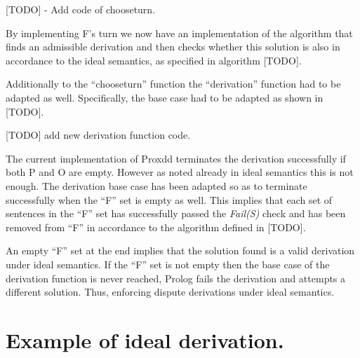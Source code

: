 [TODO] - Add code of choose\textunderscore turn.

By implementing F's turn we now have an implementation of the algorithm that finds an admissible derivation and then checks whether this solution is also in accordance to the ideal semantics, as specified in algorithm [TODO].

Additionally to the ``choose\textunderscore turn'' function the ``derivation'' function had to be adapted as well. Specifically, the base case had to be adapted as shown in [TODO].

[TODO] add new derivation function code.

The current implementation of Proxdd terminates the derivation successfully if both P and O are empty. However as noted already in ideal semantics this is not enough. The derivation base case has been adapted so as to terminate successfully when the ``F'' set is empty as well. This implies that each set of sentences in the ``F'' set has successfully  passed the \emph{Fail(S)} check and has been removed from ``F'' in accordance to the algorithm defined in [TODO]. 

An empty ``F'' set at the end implies that the solution found is a valid derivation under ideal semantics. If the ``F'' set is not empty then the base case of the derivation function is never reached, Prolog fails the derivation and attempts a different solution. Thus, enforcing dispute derivations under ideal semantics.

\section{Example of ideal derivation.}